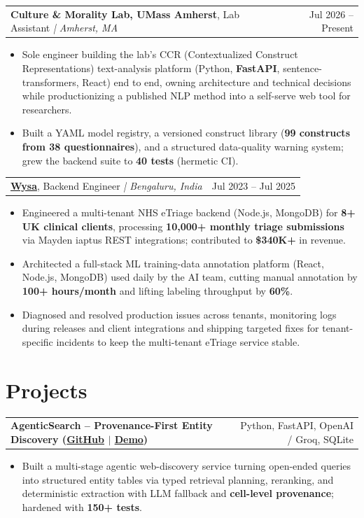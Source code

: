\documentclass[letterpaper,11pt]{article}
\makeatletter
\newcommand{\expItem}[4]{%
  \vspace{2pt}
  \begin{tabular*}{\textwidth}{@{}l@{\extracolsep{\fill}}r@{}}
    \textbf{#1}, #2 \textit{| #3} & #4 \\
  \end{tabular*}\par\vspace{-3pt}
}
\newcommand{\projItem}[2]{%
  \vspace{2pt}
  \begin{tabular*}{\textwidth}{@{}l@{\extracolsep{\fill}}r@{}}
    \textbf{#1} & #2 \\
  \end{tabular*}\par\vspace{-3pt}
}
\makeatother
\begin{document}
\expItem{Culture \& Morality Lab, UMass Amherst}{Lab Assistant}{Amherst, MA}{Jul 2026 -- Present}
\begin{itemize}
  \item Sole engineer building the lab's CCR (Contextualized Construct Representations) text-analysis platform (Python, \textbf{FastAPI}, sentence-transformers, React) end to end, owning architecture and technical decisions while productionizing a published NLP method into a self-serve web tool for researchers.
  \item Built a YAML model registry, a versioned construct library (\textbf{99 constructs from 38 questionnaires}), and a structured data-quality warning system; grew the backend suite to \textbf{40 tests} (hermetic CI).
\end{itemize}

\expItem{\href{https://www.wysa.io}{Wysa}}{Backend Engineer}{Bengaluru, India}{Jul 2023 -- Jul 2025}
\begin{itemize}
  \item Engineered a multi-tenant NHS eTriage backend (Node.js, MongoDB) for \textbf{8+ UK clinical clients}, processing \textbf{10{,}000+ monthly triage submissions} via Mayden iaptus REST integrations; contributed to \textbf{\$340K+} in revenue.
  \item Architected a full-stack ML training-data annotation platform (React, Node.js, MongoDB) used daily by the AI team, cutting manual annotation by \textbf{100+ hours/month} and lifting labeling throughput by \textbf{60\%}.
  \item Diagnosed and resolved production issues across tenants, monitoring logs during releases and client integrations and shipping targeted fixes for tenant-specific incidents to keep the multi-tenant eTriage service stable.
\end{itemize}

\section{Projects}

\projItem{AgenticSearch -- Provenance-First Entity Discovery {\normalfont\small(\href{https://github.com/Deva-1903/ciir_agentic_search}{GitHub} $\vert$ \href{https://agentic-search-negglszkwa-uc.a.run.app}{Demo})}}{Python, FastAPI, OpenAI / Groq, SQLite}
\begin{itemize}
  \item Built a multi-stage agentic web-discovery service turning open-ended queries into structured entity tables via typed retrieval planning, reranking, and deterministic extraction with LLM fallback and \textbf{cell-level provenance}; hardened with \textbf{150+ tests}.
\end{itemize}
\end{document}
